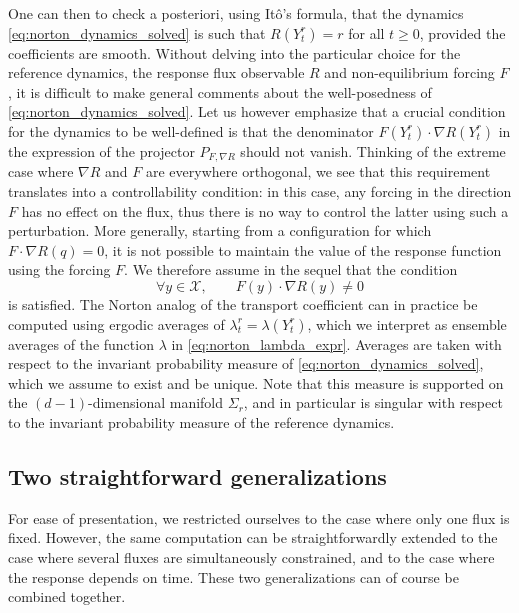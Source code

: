 \documentclass[pdflatex,sn-mathphys]{sn-jnl}%
\theoremstyle{thmstyleone}%
\theoremstyle{thmstyletwo}%
\theoremstyle{thmstylethree}%
\newcommand{\1}{\mathbbm{1}}
\newcommand{\Yr}{Y^r}
\newcommand{\lambdar}{\lambda^r}
\begin{document}
One can then to check a posteriori, using Itô's formula, that the dynamics \eqref{eq:norton_dynamics_solved} is such that $R(\Yr_t)=r$ for all $t\geq 0$, provided the coefficients are smooth.
Without delving into the particular choice for the reference dynamics, the response flux observable $R$ and non-equilibrium forcing $F$, it is difficult to make general comments about the well-posedness of \eqref{eq:norton_dynamics_solved}.
Let us however emphasize that a crucial condition for the dynamics to be well-defined is that the denominator $F(\Yr_t) \cdot \nabla R(\Yr_t)$ in the expression of the projector $P_{F,\nabla R}$ should not vanish.
Thinking of the extreme case where $\nabla R$ and $F$ are everywhere orthogonal, we see that this requirement translates into a controllability condition: in this case, any forcing in the direction $F$ has no effect on the flux, thus there is no way to control the latter using such a perturbation. More generally, starting from a configuration for which $F\cdot \nabla R(q)=0$, it is not possible to maintain the value of the response function using the forcing $F$. We therefore assume in the sequel that the condition
\begin{equation}
    \label{eq:norton_controllability_condition}
    \forall y\in\mathcal X,\qquad F(y)\cdot \nabla R(y) \neq 0
\end{equation}
is satisfied.
The Norton analog of the transport coefficient can in practice be computed using ergodic averages of $\lambdar_t=\lambda(\Yr_t)$, which we interpret as ensemble averages of the function $\lambda$ in \eqref{eq:norton_lambda_expr}. Averages are taken with respect to the invariant probability measure of \eqref{eq:norton_dynamics_solved}, which we assume to exist and be unique. Note that this measure is supported on the $(d-1)$-dimensional manifold $\Sigma_r$, and in particular is singular with respect to the invariant probability measure of the reference dynamics.

\subsection{Two straightforward generalizations}
    For ease of presentation, we restricted ourselves to the case where only one flux is fixed. However, the same computation can be straightforwardly extended to the case where several fluxes are simultaneously constrained, and to the case where the response depends on time. These two generalizations can of course be combined together.
\end{document}
